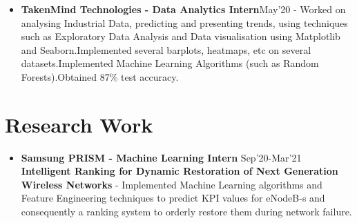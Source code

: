 \documentclass{article}
\begin{document}
\begin{itemize}
    \item{\textbf{\large{TakenMind Technologies - Data Analytics Intern}}}\hfill \textmd{May'20}
          \newline
          \textmd{- Worked on analysing Industrial Data, predicting and presenting trends, using techniques such as Exploratory Data Analysis and Data visualisation using Matplotlib and Seaborn.Implemented several barplots, heatmaps, etc on several datasets.Implemented Machine Learning Algorithms (such as Random Forests).Obtained 87\% test accuracy.}

\end{itemize}



\section*{Research Work}
\begin{itemize}
    \item{\textbf{\large{Samsung PRISM - Machine Learning Intern}}} \hfill \textmd{Sep'20-Mar'21}
          \newline
          \textbf{Intelligent Ranking for Dynamic Restoration of Next Generation Wireless Networks}
          \newline
          \textmd{- Implemented Machine Learning algorithms and Feature Engineering techniques to predict KPI values for eNodeB-s and consequently a ranking system to orderly restore them during network failure.}
\end{itemize}

\end{document}
